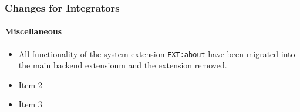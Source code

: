 %

\begin{frame}[fragile]
	\frametitle{Changes for Integrators}
	\framesubtitle{Miscellaneous}

	\begin{itemize}
		\item All functionality of the system extension \texttt{EXT:about}
			have been migrated into the main backend extensionm and the
			extension removed.
		\item Item 2
		\item Item 3
	\end{itemize}

\end{frame}

